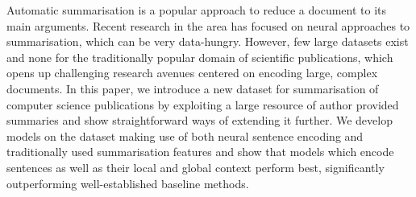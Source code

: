 Automatic summarisation is a popular approach to reduce a document to its main arguments. Recent research in the area has focused on neural approaches to summarisation, which can be very data-hungry. However, few large datasets exist and none for the traditionally popular domain of scientific publications, which opens up challenging research avenues centered on encoding large, complex documents. In this paper, we introduce a new dataset for summarisation of computer science publications by exploiting a large resource of author provided summaries and show straightforward ways of extending it further. We develop models on the dataset making use of both neural sentence encoding and traditionally used summarisation features and show that models which encode sentences as well as their local and global context perform best, significantly outperforming well-established baseline methods.
